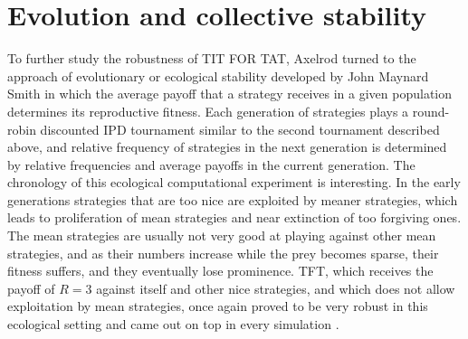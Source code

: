 \section{Evolution and collective stability}
To further study the robustness of TIT FOR TAT, Axelrod turned to the approach of evolutionary or ecological stability developed by John Maynard Smith in which the average payoff that a strategy receives in a given population determines its reproductive fitness. Each generation of strategies plays a round-robin discounted IPD tournament similar to the second tournament described above, and relative frequency of strategies in the next generation is determined by relative frequencies and average payoffs in the current generation. The chronology of this ecological computational experiment is interesting. In the early generations strategies that are too nice are exploited by meaner strategies, which leads to proliferation of mean strategies and near extinction of too forgiving ones. The mean strategies are usually not very good at playing against other mean strategies, and as their numbers increase while the prey becomes sparse, their fitness suffers, and they eventually lose prominence. TFT, which receives the payoff of $R = 3$ against itself and other nice strategies, and which does not allow exploitation by mean strategies, once again proved to be very robust in this ecological setting and came out on top in every simulation \cite[p.53]{axelrod1984evolution}.

